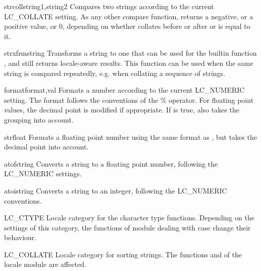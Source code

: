 \begin{funcdesc}{strcoll}{string1,string2}
Compares two strings according to the current LC_COLLATE setting. As
any other compare function, returns a negative, or a positive value,
or 0, depending on whether  collates before or after
 or is equal to it.
\end{funcdesc}

\begin{funcdesc}{strxfrm}{string}
Transforms a string to one that can be used for the builtin function
, and still returns locale-aware results. This function can be
used when the same string is compared repeatedly, e.g. when collating
a sequence of strings.
\end{funcdesc}

\begin{funcdesc}{format}{format,val}
Formats a number  according to the current LC_NUMERIC
setting. The format follows the conventions of the \% operator. For
floating point values, the decimal point is modified if
appropriate. If  is true, also takes the grouping into
account.
\end{funcdesc}

\begin{funcdesc}{str}{float}
Formats a floating point number using the same format as
, but takes the decimal point into account.
\end{funcdesc}

\begin{funcdesc}{atof}{string}
Converts a string to a floating point number, following the LC_NUMERIC
settings.
\end{funcdesc}

\begin{funcdesc}{atoi}{string}
Converts a string to an integer, following the LC_NUMERIC conventions.
\end{funcdesc}

\begin{datadesc}{LC_CTYPE}
Locale category for the character type functions. Depending on the
settings of this category, the functions of module 
dealing with case change their behaviour.
\end{datadesc}

\begin{datadesc}{LC_COLLATE}
Locale category for sorting strings. The functions  and
 of the locale module are affected.
\end{datadesc}

